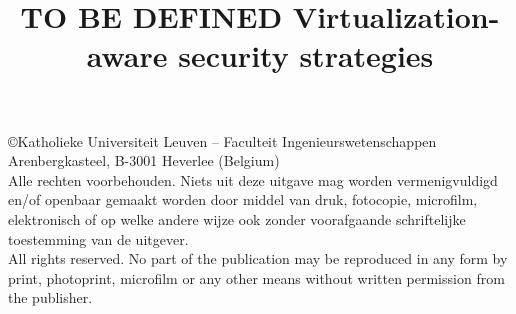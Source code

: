 %




\title{TO BE DEFINED Virtualization-aware security strategies}
\sidetitle{}





\pagestyle{empty}
\newpage
\section*{}

\vspace*{13cm}

\copyright  Katholieke Universiteit Leuven -- Faculteit Ingenieurswetenschappen\\
Arenbergkasteel, B-3001 Heverlee (Belgium)\\

\noindent
Alle rechten voorbehouden. Niets uit deze uitgave mag worden
ver\-menig\-vuldigd en/of open\-baar gemaakt worden door middel van druk,
fotocopie, microfilm, elektronisch of op welke andere wijze ook zonder
voorafgaande schriftelijke toe\-stemming van de uitgever.\\

\noindent
All rights reserved. No part of the publication may be reproduced in
any form by print, photoprint, microfilm or any other means without
written permission from the publisher.

